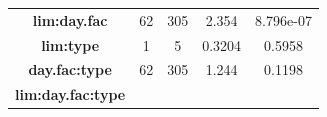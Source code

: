 \documentclass[]{article}
\begin{document}
\begin{longtable}[]{@{}ccccc@{}}
\begin{minipage}[t]{0.27\columnwidth}
\textbf{lim:day.fac}
\strut\end{minipage} &
\begin{minipage}[t]{0.10\columnwidth}\centering\strut
62
\strut\end{minipage} &
\begin{minipage}[t]{0.10\columnwidth}\centering\strut
305
\strut\end{minipage} &
\begin{minipage}[t]{0.12\columnwidth}\centering\strut
2.354
\strut\end{minipage} &
\begin{minipage}[t]{0.12\columnwidth}\centering\strut
8.796e-07
\strut\end{minipage}\tabularnewline
\begin{minipage}[t]{0.27\columnwidth}\centering\strut
\textbf{lim:type}
\strut\end{minipage} &
\begin{minipage}[t]{0.10\columnwidth}\centering\strut
1
\strut\end{minipage} &
\begin{minipage}[t]{0.10\columnwidth}\centering\strut
5
\strut\end{minipage} &
\begin{minipage}[t]{0.12\columnwidth}\centering\strut
0.3204
\strut\end{minipage} &
\begin{minipage}[t]{0.12\columnwidth}\centering\strut
0.5958
\strut\end{minipage}\tabularnewline
\begin{minipage}[t]{0.27\columnwidth}\centering\strut
\textbf{day.fac:type}
\strut\end{minipage} &
\begin{minipage}[t]{0.10\columnwidth}\centering\strut
62
\strut\end{minipage} &
\begin{minipage}[t]{0.10\columnwidth}\centering\strut
305
\strut\end{minipage} &
\begin{minipage}[t]{0.12\columnwidth}\centering\strut
1.244
\strut\end{minipage} &
\begin{minipage}[t]{0.12\columnwidth}\centering\strut
0.1198
\strut\end{minipage}\tabularnewline
\begin{minipage}[t]{0.27\columnwidth}\centering\strut
\textbf{lim:day.fac:type}
\strut\end{minipage} &

\end{longtable}
\end{document}
